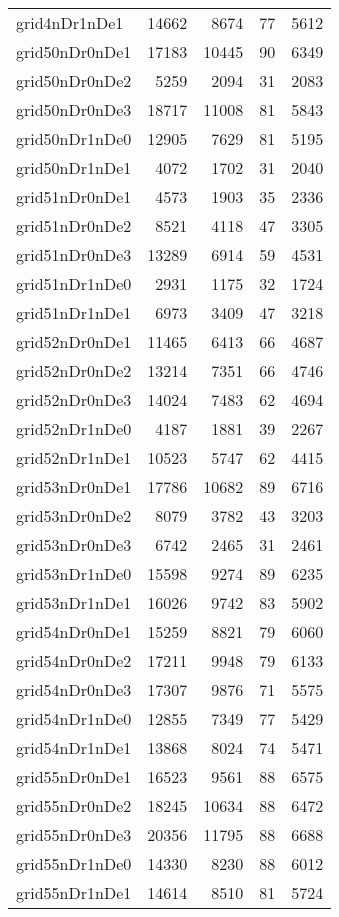 \begin{longtable}{lrrrr}
grid4nDr1nDe1 & 14662 & 8674 & 77 & 5612 \\
grid50nDr0nDe1 & 17183 & 10445 & 90 & 6349 \\
grid50nDr0nDe2 & 5259 & 2094 & 31 & 2083 \\
grid50nDr0nDe3 & 18717 & 11008 & 81 & 5843 \\
grid50nDr1nDe0 & 12905 & 7629 & 81 & 5195 \\
grid50nDr1nDe1 & 4072 & 1702 & 31 & 2040 \\
grid51nDr0nDe1 & 4573 & 1903 & 35 & 2336 \\
grid51nDr0nDe2 & 8521 & 4118 & 47 & 3305 \\
grid51nDr0nDe3 & 13289 & 6914 & 59 & 4531 \\
grid51nDr1nDe0 & 2931 & 1175 & 32 & 1724 \\
grid51nDr1nDe1 & 6973 & 3409 & 47 & 3218 \\
grid52nDr0nDe1 & 11465 & 6413 & 66 & 4687 \\
grid52nDr0nDe2 & 13214 & 7351 & 66 & 4746 \\
grid52nDr0nDe3 & 14024 & 7483 & 62 & 4694 \\
grid52nDr1nDe0 & 4187 & 1881 & 39 & 2267 \\
grid52nDr1nDe1 & 10523 & 5747 & 62 & 4415 \\
grid53nDr0nDe1 & 17786 & 10682 & 89 & 6716 \\
grid53nDr0nDe2 & 8079 & 3782 & 43 & 3203 \\
grid53nDr0nDe3 & 6742 & 2465 & 31 & 2461 \\
grid53nDr1nDe0 & 15598 & 9274 & 89 & 6235 \\
grid53nDr1nDe1 & 16026 & 9742 & 83 & 5902 \\
grid54nDr0nDe1 & 15259 & 8821 & 79 & 6060 \\
grid54nDr0nDe2 & 17211 & 9948 & 79 & 6133 \\
grid54nDr0nDe3 & 17307 & 9876 & 71 & 5575 \\
grid54nDr1nDe0 & 12855 & 7349 & 77 & 5429 \\
grid54nDr1nDe1 & 13868 & 8024 & 74 & 5471 \\
grid55nDr0nDe1 & 16523 & 9561 & 88 & 6575 \\
grid55nDr0nDe2 & 18245 & 10634 & 88 & 6472 \\
grid55nDr0nDe3 & 20356 & 11795 & 88 & 6688 \\
grid55nDr1nDe0 & 14330 & 8230 & 88 & 6012 \\
grid55nDr1nDe1 & 14614 & 8510 & 81 & 5724 \\

\end{longtable}
